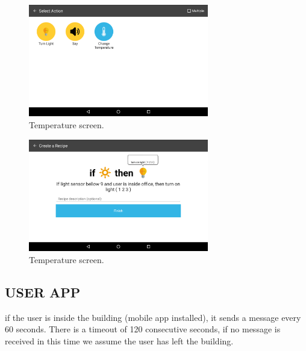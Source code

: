 \begin{figure}[h]
\centering
\includegraphics[width=0.7\textwidth]{Figures/screen_actions}
\caption{Temperature screen.}
\label{screen_actions}
\end{figure}

\begin{figure}[h]
\centering
\includegraphics[width=0.7\textwidth]{Figures/screen_completed_recipe}
\caption{Temperature screen.}
\label{screen_completed_recipe}
\end{figure}




\subsection{USER APP}





if the user is inside the building (mobile app installed), it sends a message every 60 seconds. There is a timeout of 120 consecutive seconds, if no message is received in this time we assume the user has left the building.





